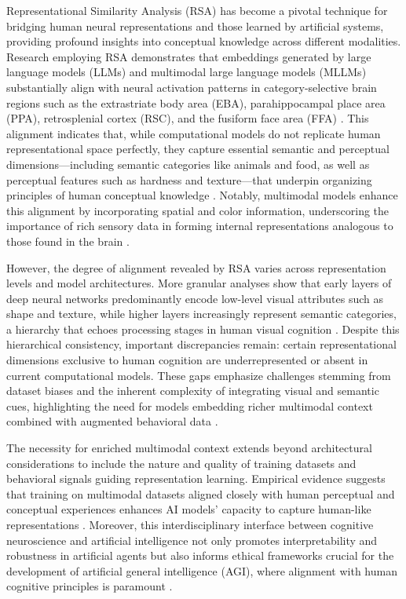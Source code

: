\documentclass[sigconf]{acmart}
\begin{document}
Representational Similarity Analysis (RSA) has become a pivotal technique for bridging human neural representations and those learned by artificial systems, providing profound insights into conceptual knowledge across different modalities. Research employing RSA demonstrates that embeddings generated by large language models (LLMs) and multimodal large language models (MLLMs) substantially align with neural activation patterns in category-selective brain regions such as the extrastriate body area (EBA), parahippocampal place area (PPA), retrosplenial cortex (RSC), and the fusiform face area (FFA) \cite{ref1,ref2}. This alignment indicates that, while computational models do not replicate human representational space perfectly, they capture essential semantic and perceptual dimensions---including semantic categories like animals and food, as well as perceptual features such as hardness and texture---that underpin organizing principles of human conceptual knowledge \cite{ref1}. Notably, multimodal models enhance this alignment by incorporating spatial and color information, underscoring the importance of rich sensory data in forming internal representations analogous to those found in the brain \cite{ref2}.

However, the degree of alignment revealed by RSA varies across representation levels and model architectures. More granular analyses show that early layers of deep neural networks predominantly encode low-level visual attributes such as shape and texture, while higher layers increasingly represent semantic categories, a hierarchy that echoes processing stages in human visual cognition \cite{ref2}. Despite this hierarchical consistency, important discrepancies remain: certain representational dimensions exclusive to human cognition are underrepresented or absent in current computational models. These gaps emphasize challenges stemming from dataset biases and the inherent complexity of integrating visual and semantic cues, highlighting the need for models embedding richer multimodal context combined with augmented behavioral data \cite{ref2,ref4,ref5}.

The necessity for enriched multimodal context extends beyond architectural considerations to include the nature and quality of training datasets and behavioral signals guiding representation learning. Empirical evidence suggests that training on multimodal datasets aligned closely with human perceptual and conceptual experiences enhances AI models’ capacity to capture human-like representations \cite{ref4,ref5}. Moreover, this interdisciplinary interface between cognitive neuroscience and artificial intelligence not only promotes interpretability and robustness in artificial agents but also informs ethical frameworks crucial for the development of artificial general intelligence (AGI), where alignment with human cognitive principles is paramount \cite{ref2,ref4,ref5}.
\end{document}
